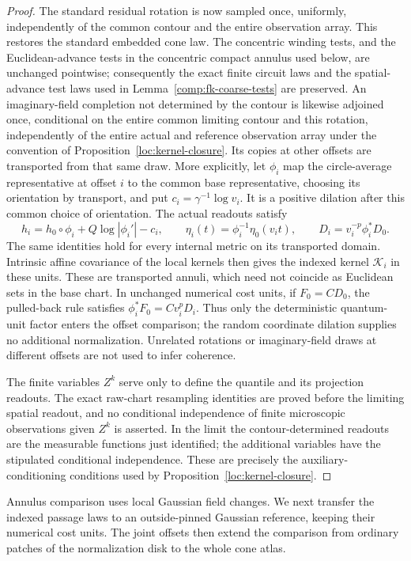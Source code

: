 \begin{proof}
The standard residual rotation is now sampled once, uniformly,
independently of the common contour and the entire observation array.
This restores the standard embedded cone law.  The concentric winding
tests, and the Euclidean-advance tests in the concentric compact annulus
used below, are unchanged pointwise; consequently the exact finite
circuit laws and the spatial-advance test laws used in
Lemma~\ref{comp:fk-coarse-tests} are preserved.  An imaginary-field completion
not determined by the contour is likewise adjoined
once, conditional on the entire common limiting contour and this
rotation, independently of the entire actual and reference observation
array under the convention of Proposition~\ref{loc:kernel-closure}.
Its copies at other offsets are transported from that same draw.
More explicitly, let $\phi_i$ map the circle-average representative
at offset $i$ to the common base representative, choosing its orientation
by transport, and put $c_i=\gamma^{-1}\log v_i$.  It is a positive
dilation after this common choice of orientation.  The actual readouts
satisfy
\[
 h_i=h_0\circ\phi_i+Q\log|\phi_i'|-c_i,\qquad
 \eta_i(t)=\phi_i^{-1}\eta_0(v_it),\qquad
 D_i=v_i^{-p}\phi_i^*D_0.
\]
The same identities hold for every internal metric on its transported
domain.  Intrinsic affine covariance of the local kernels then gives
the indexed kernel $\mathcal K_i$ in these units.  These are transported
annuli, which need not coincide as Euclidean sets in the base chart.
In unchanged numerical cost units, if $F_0=CD_0$, the pulled-back
rule satisfies $\phi_i^*F_0=Cv_i^pD_i$.  Thus only the deterministic
quantum-unit factor enters the offset comparison; the random coordinate
dilation supplies no additional normalization.
Unrelated rotations or imaginary-field draws at different offsets
are not used to infer coherence.

The finite variables $Z^k$ serve only to define the quantile and its
projection readouts.  The exact raw-chart resampling identities are
proved before the limiting spatial readout, and no conditional
independence of finite microscopic observations given $Z^k$ is
asserted.  In the limit the contour-determined readouts are the
measurable functions just identified; the additional variables have
the stipulated conditional independence.  These are precisely the
auxiliary-conditioning conditions used by
Proposition~\ref{loc:kernel-closure}.
\end{proof}

Annulus comparison uses local Gaussian field changes.  We next transfer
the indexed passage laws to an outside-pinned Gaussian reference, keeping
their numerical cost units.  The joint offsets then extend the comparison
from ordinary patches of the normalization disk to the whole cone atlas.

